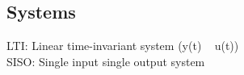 \subsection{Systems}
    LTI: Linear time-invariant system (y(t) ~ u(t))\\
    SISO: Single input single output system